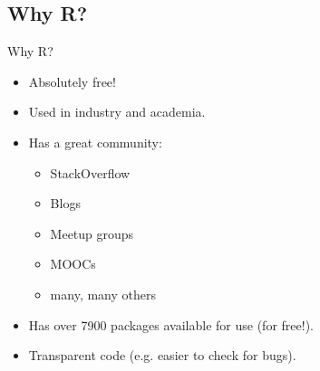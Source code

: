 \subsection{Why R?}
\begin{frame}
	\begin{center}
  		\begin{block}{Why R?} 
			\begin{itemize}
				\item Absolutely free!
				\item Used in industry and academia.
				\item Has a great community:
					\begin{itemize}
						\item StackOverflow
						\item Blogs
						\item Meetup groups
						\item MOOCs
						\item many, many others
					\end{itemize}
				\item Has over 7900 packages available for use (for free!).
				\item Transparent code (e.g. easier to check for bugs).
			\end{itemize}
		\end{block}
	\end{center} 
\end{frame}


